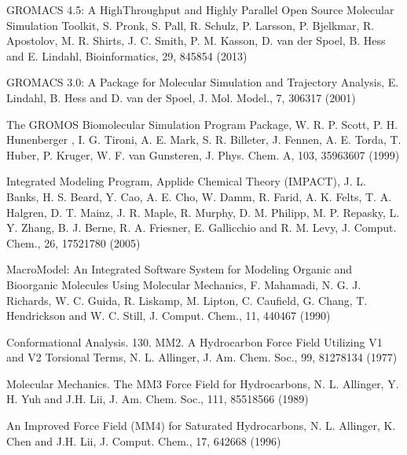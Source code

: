 \documentclass[letterpaper,11pt,english]{sphinxmanual}
\begin{document}
GROMACS 4.5: A High\sphinxhyphen{}Throughput and Highly Parallel Open Source Molecular Simulation Toolkit, S. Pronk, S. Pall, R. Schulz, P. Larsson, P. Bjelkmar, R. Apostolov, M. R. Shirts, J. C. Smith, P. M. Kasson, D. van der Spoel, B. Hess and E. Lindahl, Bioinformatics, 29, 845\sphinxhyphen{}854 (2013)

GROMACS 3.0: A Package for Molecular Simulation and Trajectory Analysis, E. Lindahl, B. Hess and D. van der Spoel, J. Mol. Model., 7, 306\sphinxhyphen{}317 (2001)


The GROMOS Biomolecular Simulation Program Package, W. R. P. Scott, P. H. Hunenberger , I. G. Tironi, A. E. Mark, S. R. Billeter, J. Fennen, A. E. Torda, T. Huber, P. Kruger, W. F. van Gunsteren, J. Phys. Chem. A, 103, 3596\sphinxhyphen{}3607 (1999)


Integrated Modeling Program, Applide Chemical Theory (IMPACT), J. L. Banks, H. S. Beard, Y. Cao, A. E. Cho, W. Damm, R. Farid, A. K. Felts, T. A. Halgren, D. T. Mainz, J. R. Maple, R. Murphy, D. M. Philipp, M. P. Repasky, L. Y. Zhang, B. J. Berne, R. A. Friesner, E. Gallicchio and R. M. Levy, J. Comput. Chem., 26, 1752\sphinxhyphen{}1780 (2005)


MacroModel: An Integrated Software System for Modeling Organic and Bioorganic Molecules Using Molecular Mechanics, F. Mahamadi, N. G. J. Richards, W. C. Guida, R. Liskamp, M. Lipton, C. Caufield, G. Chang, T. Hendrickson and W. C. Still, J. Comput. Chem., 11, 440\sphinxhyphen{}467 (1990)


Conformational Analysis. 130. MM2. A Hydrocarbon Force Field Utilizing V1 and V2 Torsional Terms, N. L. Allinger, J. Am. Chem. Soc., 99, 8127\sphinxhyphen{}8134 (1977)


Molecular Mechanics. The MM3 Force Field for Hydrocarbons, N. L. Allinger, Y. H. Yuh and J.\sphinxhyphen{}H. Lii, J. Am. Chem. Soc., 111, 8551\sphinxhyphen{}8566 (1989)


An Improved Force Field (MM4) for Saturated Hydrocarbons, N. L. Allinger, K. Chen and J.\sphinxhyphen{}H. Lii, J. Comput. Chem., 17, 642\sphinxhyphen{}668 (1996)

\end{document}
